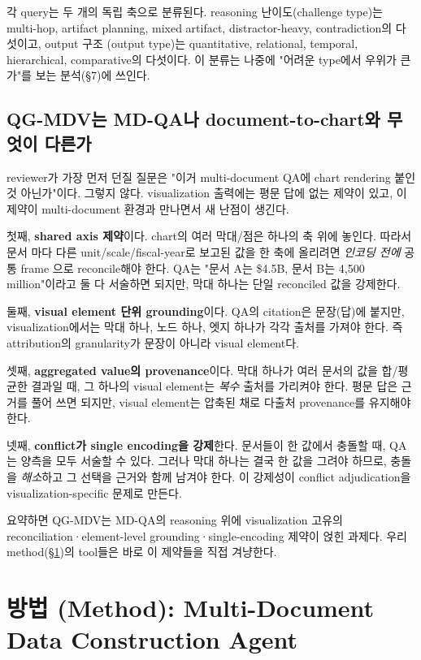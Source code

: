 \documentclass[11pt]{article}
\begin{document}
각 query는 두 개의 독립 축으로 분류된다. reasoning 난이도(challenge type)는 multi-hop,
artifact planning, mixed artifact, distractor-heavy, contradiction의 다섯이고, output 구조
(output type)는 quantitative, relational, temporal, hierarchical, comparative의 다섯이다.
이 분류는 나중에 "어려운 type에서 우위가 큰가"를 보는 분석(§7)에 쓰인다.

\subsection{QG-MDV는 MD-QA나 document-to-chart와 무엇이 다른가}
\label{sec:diff}

reviewer가 가장 먼저 던질 질문은 "이거 multi-document QA에 chart rendering 붙인 것 아닌가"이다.
그렇지 않다. visualization 출력에는 평문 답에 없는 제약이 있고, 이 제약이 multi-document 환경과
만나면서 새 난점이 생긴다.

첫째, \textbf{shared axis 제약}이다. chart의 여러 막대/점은 하나의 축 위에 놓인다. 따라서 문서
마다 다른 unit/scale/fiscal-year로 보고된 값을 한 축에 올리려면 \emph{인코딩 전에} 공통 frame
으로 reconcile해야 한다. QA는 "문서 A는 \$4.5B, 문서 B는 4,500 million"이라고 둘 다 서술하면
되지만, 막대 하나는 단일 reconciled 값을 강제한다.

둘째, \textbf{visual element 단위 grounding}이다. QA의 citation은 문장(답)에 붙지만,
visualization에서는 막대 하나, 노드 하나, 엣지 하나가 각각 출처를 가져야 한다. 즉 attribution의
granularity가 문장이 아니라 visual element다.

셋째, \textbf{aggregated value의 provenance}이다. 막대 하나가 여러 문서의 값을 합/평균한
결과일 때, 그 하나의 visual element는 \emph{복수} 출처를 가리켜야 한다. 평문 답은 근거를 풀어
쓰면 되지만, visual element는 압축된 채로 다출처 provenance를 유지해야 한다.

넷째, \textbf{conflict가 single encoding을 강제}한다. 문서들이 한 값에서 충돌할 때, QA는 양측을
모두 서술할 수 있다. 그러나 막대 하나는 결국 한 값을 그려야 하므로, 충돌을 \emph{해소}하고 그
선택을 근거와 함께 남겨야 한다. 이 강제성이 conflict adjudication을 visualization-specific
문제로 만든다.

요약하면 QG-MDV는 MD-QA의 reasoning 위에 visualization 고유의 reconciliation·element-level
grounding·single-encoding 제약이 얹힌 과제다. 우리 method(\S\ref{sec:method})의 tool들은 바로
이 제약들을 직접 겨냥한다.

\section{방법 (Method): Multi-Document Data Construction Agent}
\label{sec:method}
\end{document}
